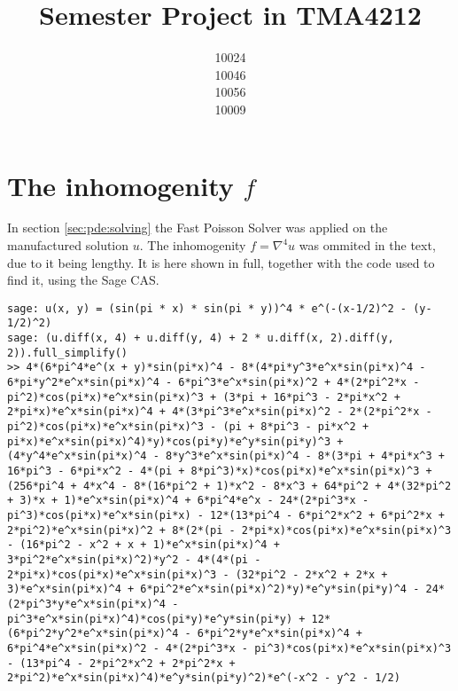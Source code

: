 \documentclass{article}
\title{Semester Project in TMA4212}
\author{
  10024\\ 
  10046\\
  10056\\
  10009
}
\theoremstyle{definition}
\begin{document}
\maketitle
\tableofcontents
\newpage



\clearpage


\clearpage


\clearpage


\clearpage


\clearpage


\newpage
\appendix
\section{The inhomogenity \texorpdfstring{$f$}{f}}
In section \ref{sec:pde:solving} the Fast Poisson Solver was applied on the manufactured solution $u$.
The inhomogenity $f = \nabla^4 u$ was ommited in the text, due to it being lengthy.
It is here shown in full, together with the code used to find it, using the Sage CAS.
\begin{lstlisting}
sage: u(x, y) = (sin(pi * x) * sin(pi * y))^4 * e^(-(x-1/2)^2 - (y-1/2)^2)
sage: (u.diff(x, 4) + u.diff(y, 4) + 2 * u.diff(x, 2).diff(y, 2)).full_simplify()
>> 4*(6*pi^4*e^(x + y)*sin(pi*x)^4 - 8*(4*pi*y^3*e^x*sin(pi*x)^4 - 6*pi*y^2*e^x*sin(pi*x)^4 - 6*pi^3*e^x*sin(pi*x)^2 + 4*(2*pi^2*x - pi^2)*cos(pi*x)*e^x*sin(pi*x)^3 + (3*pi + 16*pi^3 - 2*pi*x^2 + 2*pi*x)*e^x*sin(pi*x)^4 + 4*(3*pi^3*e^x*sin(pi*x)^2 - 2*(2*pi^2*x - pi^2)*cos(pi*x)*e^x*sin(pi*x)^3 - (pi + 8*pi^3 - pi*x^2 + pi*x)*e^x*sin(pi*x)^4)*y)*cos(pi*y)*e^y*sin(pi*y)^3 + (4*y^4*e^x*sin(pi*x)^4 - 8*y^3*e^x*sin(pi*x)^4 - 8*(3*pi + 4*pi*x^3 + 16*pi^3 - 6*pi*x^2 - 4*(pi + 8*pi^3)*x)*cos(pi*x)*e^x*sin(pi*x)^3 + (256*pi^4 + 4*x^4 - 8*(16*pi^2 + 1)*x^2 - 8*x^3 + 64*pi^2 + 4*(32*pi^2 + 3)*x + 1)*e^x*sin(pi*x)^4 + 6*pi^4*e^x - 24*(2*pi^3*x - pi^3)*cos(pi*x)*e^x*sin(pi*x) - 12*(13*pi^4 - 6*pi^2*x^2 + 6*pi^2*x + 2*pi^2)*e^x*sin(pi*x)^2 + 8*(2*(pi - 2*pi*x)*cos(pi*x)*e^x*sin(pi*x)^3 - (16*pi^2 - x^2 + x + 1)*e^x*sin(pi*x)^4 + 3*pi^2*e^x*sin(pi*x)^2)*y^2 - 4*(4*(pi - 2*pi*x)*cos(pi*x)*e^x*sin(pi*x)^3 - (32*pi^2 - 2*x^2 + 2*x + 3)*e^x*sin(pi*x)^4 + 6*pi^2*e^x*sin(pi*x)^2)*y)*e^y*sin(pi*y)^4 - 24*(2*pi^3*y*e^x*sin(pi*x)^4 - pi^3*e^x*sin(pi*x)^4)*cos(pi*y)*e^y*sin(pi*y) + 12*(6*pi^2*y^2*e^x*sin(pi*x)^4 - 6*pi^2*y*e^x*sin(pi*x)^4 + 6*pi^4*e^x*sin(pi*x)^2 - 4*(2*pi^3*x - pi^3)*cos(pi*x)*e^x*sin(pi*x)^3 - (13*pi^4 - 2*pi^2*x^2 + 2*pi^2*x + 2*pi^2)*e^x*sin(pi*x)^4)*e^y*sin(pi*y)^2)*e^(-x^2 - y^2 - 1/2)
\end{lstlisting}
\clearpage
\printbibliography

\end{document}
